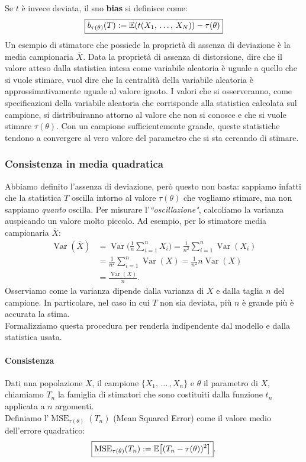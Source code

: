 \noindent Se $t$ è invece deviata, il suo \textbf{bias} si definisce come: \[
\boxed{b_{\tau(\theta)}(T) := \mathbb{E}(t(X_1, \, \dots, \, X_N)) - \tau(\theta)}
\]
Un esempio di stimatore che possiede la proprietà di assenza di deviazione è la media campionaria $\overline{X}$.
\newline
Data la proprietà di assenza di distorsione, dire che il valore atteso dalla statistica intesa come variabile aleatoria è uguale a quello che si vuole stimare, vuol dire che la centralità della variabile aleatoria è approssimativamente uguale al valore ignoto. I valori che si osserveranno, come specificazioni della variabile aleatoria che corrisponde alla statistica calcolata sul campione, si distribuiranno attorno al valore che non si conosce e che si vuole stimare $\tau(\theta)$. Con un campione sufficientemente grande, queste statistiche tendono a convergere al vero valore del parametro che si sta cercando di stimare.

\subsubsection{Consistenza in media quadratica}
Abbiamo definito l'assenza di deviazione, però questo non basta: sappiamo infatti che la statistica $T$ oscilla intorno al valore $\tau(\theta)$ che vogliamo stimare, ma non sappiamo \textit{quanto} oscilla. 
Per misurare l'\textit{``oscillazione"}, calcoliamo la varianza auspicando un valore molto piccolo. Ad esempio, per lo stimatore media campionaria $\overline{X}$:
\begin{align*}
    \operatorname{Var}(\overline{X}) &= \operatorname{Var} \biggl (\frac{1}{n} \sum_{i=1}^n X_i \biggr ) = \frac{1}{n^2} \sum_{i=1}^n \operatorname{Var}(X_i) \\
    &= \frac{1}{n^2} \sum_{i=1}^n \operatorname{Var}(X) = \frac{1}{n^2} n\operatorname{Var}(X) \\
    &=\frac{\operatorname{Var}(X)}{n}.
\end{align*}
Osserviamo come la varianza dipende dalla varianza di $X$ e dalla taglia $n$ del campione. 
In particolare, nel caso in cui $T$ non sia deviata, più $n$ è grande più è accurata la stima. \\

\noindent Formalizziamo questa procedura per renderla indipendente dal modello e dalla statistica usata.

\paragraph{Consistenza}
Dati una popolazione $X$, il campione $\{X_1, \, \dots \, , X_n\}$ e $\theta$ il parametro di $X$, chiamiamo $T_n$ la famiglia di stimatori che sono costituiti dalla funzione $t_n$ applicata a $n$ argomenti. \\
Definiamo l'$\operatorname{MSE}_{\tau(\theta)}(T_n)$ (Mean Squared Error) come il valore medio dell'errore quadratico:
\[
\boxed{
\operatorname{MSE}_{\tau(\theta)}(T_n) := \mathbb{E} \! \left[(T_n - \tau(\theta))^2 \right ]
}.
\]

